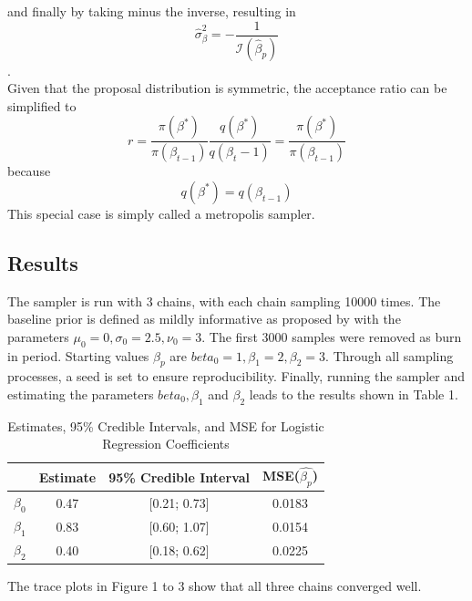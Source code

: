 \documentclass[10.5pt]{article}
\begin{document}
and finally by taking minus the inverse, resulting in
\[\hat{\sigma}_{\beta}^2 = -\frac{1}{\mathcal{I}(\hat{\beta}_p)} \]
. \\
Given that the proposal distribution is symmetric, the acceptance ratio can be simplified to
\begin{equation}
    r = \frac{\pi(\beta^{*})}{\pi(\beta_{t-1})}\frac{q(\beta^{*})}{q(\beta_t-1)} = \frac{\pi(\beta^{*})}{\pi(\beta_{t-1})}
\end{equation}
because 
\begin{equation}
    q(\beta^{*}) = q(\beta_{t-1})
\end{equation}
This special case is simply called a metropolis sampler. \\

\subsection{Results}
The sampler is run with 3 chains, with each chain sampling 10000 times. The baseline prior is defined as mildly informative as proposed by \cite{salvatore2024bayesian} with the parameters \(\mu_0 = 0, \sigma_0 = 2.5, \nu_0 = 3\). The first 3000 samples were removed as burn in period. Starting values \(\beta_p\) are \(beta_0 = 1, \beta_1 = 2, \beta_2 = 3\). Through all sampling processes, a seed is set to ensure reproducibility.
Finally, running the sampler and estimating the parameters \(beta_0, \beta_1\) and \(\beta_2\) leads to the results shown in Table 1.
\begin{table}[ht]
    \centering
    \caption{Estimates, 95\% Credible Intervals, and MSE for Logistic Regression Coefficients}
    \begin{tabular}{lccc}
        \toprule
        & Estimate & 95\% Credible Interval & MSE(\(\hat{\beta_p}\)) \\
        \midrule
        $\beta_0$ & 0.47 & [0.21; 0.73] & 0.0183 \\
        $\beta_1$ & 0.83 & [0.60; 1.07] & 0.0154 \\
        $\beta_2$ & 0.40 & [0.18; 0.62] & 0.0225 \\
        \bottomrule
    \end{tabular}
\end{table}
The trace plots in Figure 1 to 3 show that all three chains converged well. \\
\end{document}
